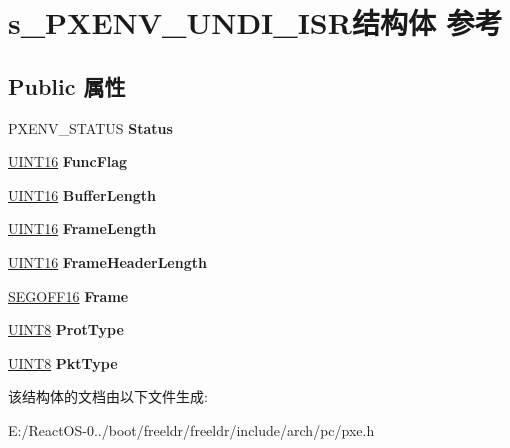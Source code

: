 \hypertarget{structs___p_x_e_n_v___u_n_d_i___i_s_r}{}\section{s\+\_\+\+P\+X\+E\+N\+V\+\_\+\+U\+N\+D\+I\+\_\+\+I\+S\+R结构体 参考}
\label{structs___p_x_e_n_v___u_n_d_i___i_s_r}
\subsection*{Public 属性}
\begin{DoxyCompactItemize}
\item 
\mbox{\label{structs___p_x_e_n_v___u_n_d_i___i_s_r_af908b934abb7fde293ce59f6d38994ab}} 
P\+X\+E\+N\+V\+\_\+\+S\+T\+A\+T\+US {\bfseries Status}
\item 
\mbox{\label{structs___p_x_e_n_v___u_n_d_i___i_s_r_a17fe347b21606f2bfb616d9eac712e6e}} 
\hyperlink{_processor_bind_8h_a09f1a1fb2293e33483cc8d44aefb1eb1}{U\+I\+N\+T16} {\bfseries Func\+Flag}
\item 
\mbox{\label{structs___p_x_e_n_v___u_n_d_i___i_s_r_a12a3c9ffbc79fadfadd25eadfb482d68}} 
\hyperlink{_processor_bind_8h_a09f1a1fb2293e33483cc8d44aefb1eb1}{U\+I\+N\+T16} {\bfseries Buffer\+Length}
\item 
\mbox{\label{structs___p_x_e_n_v___u_n_d_i___i_s_r_adcae04267f48bdced997bf57cc5acdbe}} 
\hyperlink{_processor_bind_8h_a09f1a1fb2293e33483cc8d44aefb1eb1}{U\+I\+N\+T16} {\bfseries Frame\+Length}
\item 
\mbox{\label{structs___p_x_e_n_v___u_n_d_i___i_s_r_a671595f4bf05b0b0d2d7facaeaa17188}} 
\hyperlink{_processor_bind_8h_a09f1a1fb2293e33483cc8d44aefb1eb1}{U\+I\+N\+T16} {\bfseries Frame\+Header\+Length}
\item 
\mbox{\label{structs___p_x_e_n_v___u_n_d_i___i_s_r_adb5da17ee638debf6d0290e30a699e17}} 
\hyperlink{structs___s_e_g_o_f_f16}{S\+E\+G\+O\+F\+F16} {\bfseries Frame}
\item 
\mbox{\label{structs___p_x_e_n_v___u_n_d_i___i_s_r_a1c830a8c112d71ba3340c0fa9b9910e5}} 
\hyperlink{_processor_bind_8h_ab27e9918b538ce9d8ca692479b375b6a}{U\+I\+N\+T8} {\bfseries Prot\+Type}
\item 
\mbox{\label{structs___p_x_e_n_v___u_n_d_i___i_s_r_a087d4d46db22dd3c3986a8a0f8ef0aa1}} 
\hyperlink{_processor_bind_8h_ab27e9918b538ce9d8ca692479b375b6a}{U\+I\+N\+T8} {\bfseries Pkt\+Type}
\end{DoxyCompactItemize}


该结构体的文档由以下文件生成\+:\begin{DoxyCompactItemize}
\item 
E\+:/\+React\+O\+S-\/0../boot/freeldr/freeldr/include/arch/pc/pxe.\+h\end{DoxyCompactItemize}
